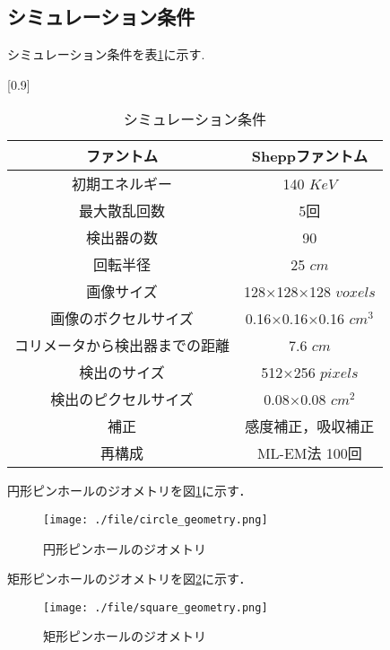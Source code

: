 \documentclass[dvipdfmx,autodetect-engine,twocolumn,10pt]{jsarticle}%
\begin{document}
\subsection{シミュレーション条件}
シミュレーション条件を表\ref{simu_2d}に示す.
\begin{table}[htbp]
  \begin{center}
    \caption{シミュレーション条件}
    \label{simu_2d}
    \small
    \scalebox{0.82}[0.9]

    {
      \begin{tabular}{|c|c|} \hline
        ファントム & Sheppファントム \\ \hline
        初期エネルギー & 140 $KeV$ \\ \hline
        最大散乱回数 & 5回 \\ \hline
        検出器の数 & 90 \\ \hline
        回転半径 & 25 $cm$ \\ \hline
        画像サイズ & 128×128×128 $voxels$ \\ \hline
        画像のボクセルサイズ & 0.16×0.16×0.16 $cm^3$ \\ \hline
        コリメータから検出器までの距離 & 7.6 $cm$ \\ \hline
        検出のサイズ & 512×256 $pixels$ \\ \hline
        検出のピクセルサイズ & 0.08×0.08 $cm^2$ \\ \hline
        補正 & 感度補正，吸収補正 \\ \hline
        再構成 & ML-EM法 100回 \\ \hline
      \end{tabular}
    }
  \end{center}
\end{table}


円形ピンホールのジオメトリを図\ref{circle_pinhole}に示す．
\begin{figure}[htbp]
  \begin{center}
    \texttt{[image: ./file/circle\_geometry.png]}\\
    \caption{円形ピンホールのジオメトリ}
    \label{circle_pinhole}
  \end{center}
\end{figure}

\newpage
矩形ピンホールのジオメトリを図\ref{square_pinhole}に示す．

\begin{figure}[htbp]
  \begin{center}
    \texttt{[image: ./file/square\_geometry.png]}\\
    \caption{矩形ピンホールのジオメトリ}
    \label{square_pinhole}
  \end{center}
\end{figure}
\end{document}
